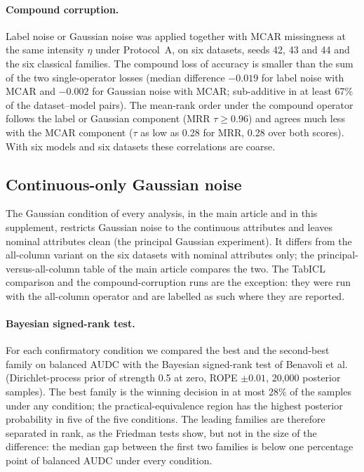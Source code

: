 \documentclass[pdflatex,sn-mathphys]{sn-jnl}
\theoremstyle{thmstyleone}
\begin{document}
\paragraph{Compound corruption.} Label noise or Gaussian noise was applied together with MCAR missingness at the same intensity $\eta$ under Protocol~A, on six datasets, seeds 42, 43 and 44 and the six classical families. The compound loss of accuracy is smaller than the sum of the two single-operator losses (median difference $-0.019$ for label noise with MCAR and $-0.002$ for Gaussian noise with MCAR; sub-additive in at least 67\% of the dataset--model pairs). The mean-rank order under the compound operator follows the label or Gaussian component (MRR $\tau\ge0.96$) and agrees much less with the MCAR component ($\tau$ as low as 0.28 for MRR, 0.28 over both scores). With six models and six datasets these correlations are coarse.

\subsection{Continuous-only Gaussian noise}
The Gaussian condition of every analysis, in the main article and in this supplement, restricts Gaussian noise to the continuous attributes and leaves nominal attributes clean (the principal Gaussian experiment). It differs from the all-column variant on the six datasets with nominal attributes only; the principal-versus-all-column table of the main article compares the two. The TabICL comparison and the compound-corruption runs are the exception: they were run with the all-column operator and are labelled as such where they are reported.

\paragraph{Bayesian signed-rank test.} For each confirmatory condition we compared the best and the second-best family on balanced AUDC with the Bayesian signed-rank test of Benavoli et al.~\cite{benavoli2016should} (Dirichlet-process prior of strength 0.5 at zero, ROPE $\pm0.01$, 20{,}000 posterior samples). The best family is the winning decision in at most 28\% of the samples under any condition; the practical-equivalence region has the highest posterior probability in five of the five conditions. The leading families are therefore separated in rank, as the Friedman tests show, but not in the size of the difference: the median gap between the first two families is below one percentage point of balanced AUDC under every condition.
\end{document}

